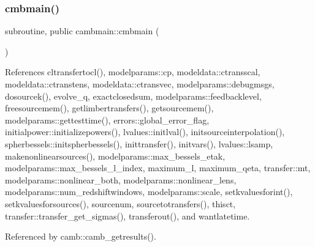 \subsubsection{\texorpdfstring{cmbmain()}{cmbmain()}}
{\footnotesize\ttfamily subroutine, public cambmain\+::cmbmain (\begin{DoxyParamCaption}{ }\end{DoxyParamCaption})}



References cltransfertocl(), modelparams\+::cp, modeldata\+::ctransscal, modeldata\+::ctranstens, modeldata\+::ctransvec, modelparams\+::debugmsgs, dosourcek(), evolve\+\_\+q, exactclosedsum, modelparams\+::feedbacklevel, freesourcemem(), getlimbertransfers(), getsourcemem(), modelparams\+::gettesttime(), errors\+::global\+\_\+error\+\_\+flag, initialpower\+::initializepowers(), lvalues\+::initlval(), initsourceinterpolation(), spherbessels\+::initspherbessels(), inittransfer(), initvars(), lvalues\+::lsamp, makenonlinearsources(), modelparams\+::max\+\_\+bessels\+\_\+etak, modelparams\+::max\+\_\+bessels\+\_\+l\+\_\+index, maximum\+\_\+l, maximum\+\_\+qeta, transfer\+::mt, modelparams\+::nonlinear\+\_\+both, modelparams\+::nonlinear\+\_\+lens, modelparams\+::num\+\_\+redshiftwindows, modelparams\+::scale, setkvaluesforint(), setkvaluesforsources(), sourcenum, sourcetotransfers(), thisct, transfer\+::transfer\+\_\+get\+\_\+sigmas(), transferout(), and wantlatetime.



Referenced by camb\+::camb\+\_\+getresults().

